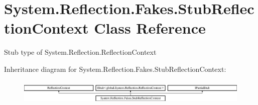 \hypertarget{class_system_1_1_reflection_1_1_fakes_1_1_stub_reflection_context}{\section{System.\-Reflection.\-Fakes.\-Stub\-Reflection\-Context Class Reference}
\label{class_system_1_1_reflection_1_1_fakes_1_1_stub_reflection_context}
}


Stub type of System.\-Reflection.\-Reflection\-Context 


Inheritance diagram for System.\-Reflection.\-Fakes.\-Stub\-Reflection\-Context\-:\begin{figure}[H]
\begin{center}
\leavevmode
\includegraphics[height=1.196581cm]{class_system_1_1_reflection_1_1_fakes_1_1_stub_reflection_context}
\end{center}
\end{figure}
